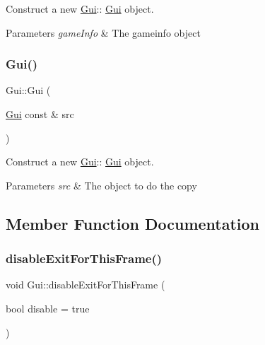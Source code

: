 Construct a new \hyperlink{class_gui}{Gui}\+:\+: \hyperlink{class_gui}{Gui} object. 


\begin{DoxyParams}{Parameters}
{\em game\+Info} & The gameinfo object \\
\hline
\end{DoxyParams}
\mbox{\label{class_gui_aaaa336f8359cadcbbad3eb204dc7f95b}} 
\subsubsection{\texorpdfstring{Gui()}{Gui()}\hspace{0.1cm}{\footnotesize\ttfamily [2/2]}}
{\footnotesize\ttfamily Gui\+::\+Gui (\begin{DoxyParamCaption}\item[{\hyperlink{class_gui}{Gui} const \&}]{src }\end{DoxyParamCaption})}



Construct a new \hyperlink{class_gui}{Gui}\+:\+: \hyperlink{class_gui}{Gui} object. 


\begin{DoxyParams}{Parameters}
{\em src} & The object to do the copy \\
\hline
\end{DoxyParams}


\subsection{Member Function Documentation}
\mbox{\label{class_gui_a454e08f8d8c19a95c5bb9554b7766723}} 
\subsubsection{\texorpdfstring{disable\+Exit\+For\+This\+Frame()}{disableExitForThisFrame()}}
{\footnotesize\ttfamily void Gui\+::disable\+Exit\+For\+This\+Frame (\begin{DoxyParamCaption}\item[{bool}]{disable = {\ttfamily true} }\end{DoxyParamCaption})}



